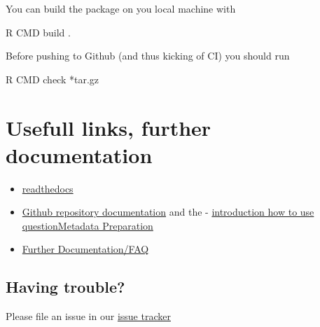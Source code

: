 \documentclass[
]{article}
\newenvironment{Shaded}{\begin{snugshade}}{\end{snugshade}}
\newcommand{\ExtensionTok}[1]{#1}
\newcommand{\NormalTok}[1]{#1}
\providecommand{\tightlist}{%
  \setlength{\itemsep}{0pt}\setlength{\parskip}{0pt}}
\begin{document}
You can build the package on you local machine with

\begin{Shaded}
\begin{Highlighting}[]
\ExtensionTok{R}\NormalTok{ CMD build .}
\end{Highlighting}
\end{Shaded}

Before pushing to Github (and thus kicking of CI) you should run

\begin{Shaded}
\begin{Highlighting}[]
\ExtensionTok{R}\NormalTok{ CMD check *tar.gz}
\end{Highlighting}
\end{Shaded}

\hypertarget{usefull-links-further-documentation}{%
\section{Usefull links, further
documentation}\label{usefull-links-further-documentation}}

\begin{itemize}
\tightlist
\item
  \href{https://metadatamanagement.readthedocs.io/de/stable/questions.html}{readthedocs}
\item
  \href{https://dzhw.github.io/questionMetadataPreparation/index.html}{Github
  repository documentation} and the -
  \href{https://dzhw.github.io/questionMetadataPreparation/articles/question_metadata_preparation_introduction.html}{introduction
  how to use questionMetadata Preparation}
\item
  \href{https://dzhw.github.io/questionMetadataPreparation/articles/general_workflow_and_tips.html}{Further
  Documentation/FAQ}
\end{itemize}

\hypertarget{having-trouble}{%
\subsection{Having trouble?}\label{having-trouble}}

Please file an issue in our
\href{https://github.com/dzhw/metadatamanagement/issues}{issue tracker}
\end{document}
